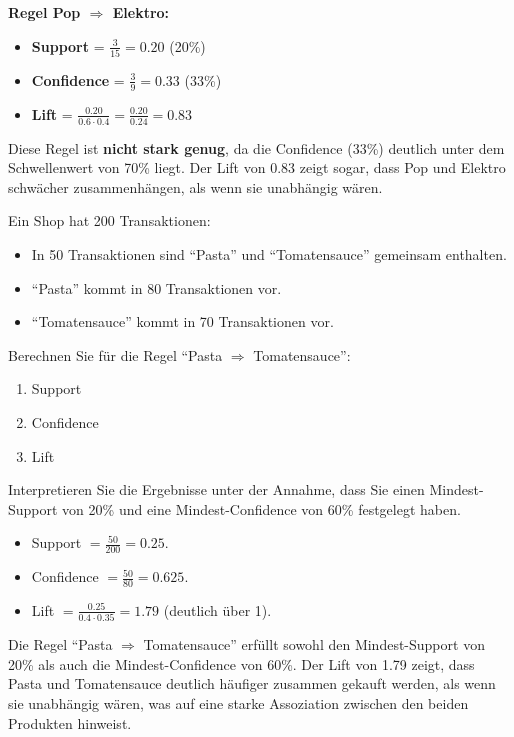 \begin{myexercise}
\begin{myanswer}
        \textbf{Regel Pop $\Rightarrow$ Elektro:}
        \begin{itemize}
            \item \textbf{Support} = $\frac{3}{15} = 0.20$ (20\%)
            \item \textbf{Confidence} = $\frac{3}{9} = 0.33$ (33\%)
            \item \textbf{Lift} = $\frac{0.20}{0.6 \cdot 0.4} = \frac{0.20}{0.24} = 0.83$
        \end{itemize}

        Diese Regel ist \textbf{nicht stark genug}, da die Confidence (33\%) deutlich unter dem Schwellenwert von 70\% liegt. Der Lift von 0.83 zeigt sogar, dass Pop und Elektro schwächer zusammenhängen, als wenn sie unabhängig wären.
    \end{myanswer}

\end{myexercise}

\begin{myexercise}
    Ein Shop hat 200 Transaktionen:
    \begin{itemize}
        \item In 50 Transaktionen sind \enquote{Pasta} und \enquote{Tomatensauce} gemeinsam enthalten.
        \item \enquote{Pasta} kommt in 80 Transaktionen vor.
        \item \enquote{Tomatensauce} kommt in 70 Transaktionen vor.
    \end{itemize}
    Berechnen Sie für die Regel
    \enquote{Pasta $\Rightarrow$ Tomatensauce}:
    \begin{enumerate}
        \item Support
        \item Confidence
        \item Lift
    \end{enumerate}

    Interpretieren Sie die Ergebnisse unter der Annahme, dass Sie einen Mindest-Support von 20\% und eine Mindest-Confidence von 60\% festgelegt haben.
    \begin{myanswer}
        \begin{itemize}
            \item Support $= \frac{50}{200}=0.25$.
            \item Confidence $= \frac{50}{80}=0.625$.
            \item Lift $= \frac{0.25}{0.4\cdot0.35}=1.79$ (deutlich über 1).
        \end{itemize}
        Die Regel \enquote{Pasta $\Rightarrow$ Tomatensauce} erfüllt sowohl den Mindest-Support von 20\% als auch die Mindest-Confidence von 60\%. Der Lift von 1.79 zeigt, dass Pasta und Tomatensauce deutlich häufiger zusammen gekauft werden, als wenn sie unabhängig wären, was auf eine starke Assoziation zwischen den beiden Produkten hinweist.
    \end{myanswer}
\end{myexercise}


